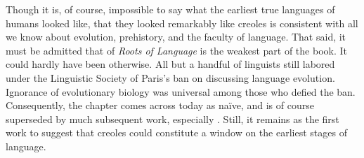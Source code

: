 Though it is, of course, impossible to say what the earliest true languages of humans looked like, that they looked remarkably like creoles is consistent with all we know about evolution, prehistory, and the faculty of language. That said, it must be admitted that  of \textit{Roots of Language} is the weakest part of the book. It could hardly have been otherwise. All but a handful of linguists still labored under the Linguistic Society of Paris’s ban on discussing language evolution. Ignorance of evolutionary biology was universal among those who defied the ban. Consequently, the chapter comes across today as naïve, and is of course superseded by much subsequent work, especially \citet{Bickerton2009,Bickerton2014}. Still, it remains as the first work to suggest that creoles could constitute a window on the earliest stages of language.